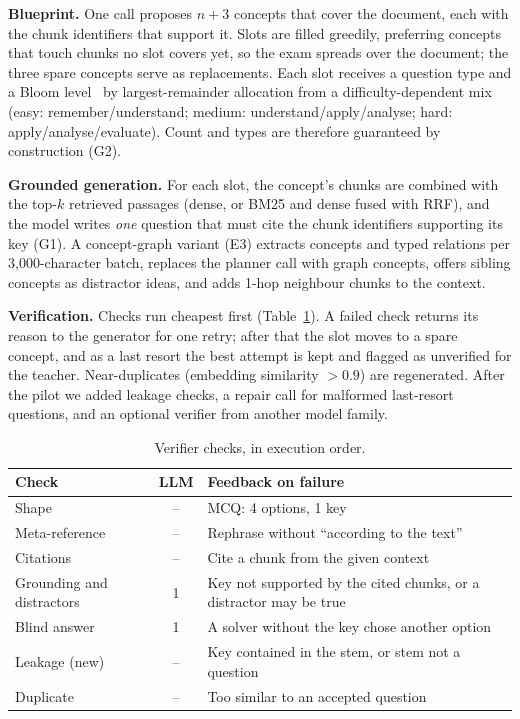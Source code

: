 \documentclass[conference]{IEEEtran}
\begin{document}
\textbf{Blueprint.} One call proposes $n+3$ concepts that cover the document, each with the chunk
identifiers that support it. Slots are filled greedily, preferring concepts that touch chunks no slot
covers yet, so the exam spreads over the document; the three spare concepts serve as replacements.
Each slot receives a question type and a Bloom level~\cite{anderson2001bloom} by largest-remainder
allocation from a difficulty-dependent mix (easy: remember/understand; medium:
understand/apply/analyse; hard: apply/analyse/evaluate). Count and types are therefore guaranteed by
construction (G2).

\textbf{Grounded generation.} For each slot, the concept's chunks are combined with the top-$k$
retrieved passages (dense, or BM25 and dense fused with RRF), and the model writes \emph{one}
question that must cite the chunk identifiers supporting its key (G1). A concept-graph variant (E3)
extracts concepts and typed relations per 3{,}000-character batch, replaces the planner call with graph
concepts, offers sibling concepts as distractor ideas, and adds 1-hop neighbour chunks to the context.

\textbf{Verification.} Checks run cheapest first (Table~\ref{tab:verifier}). A failed check returns its
reason to the generator for one retry; after that the slot moves to a spare concept, and as a last
resort the best attempt is kept and flagged as unverified for the teacher. Near-duplicates (embedding
similarity $>0.9$) are regenerated. After the pilot we added leakage checks, a repair call for malformed
last-resort questions, and an optional verifier from another model family.

\begin{table}[t]
\centering
\caption{Verifier checks, in execution order.}
\label{tab:verifier}
\footnotesize
\setlength{\tabcolsep}{3pt}
\begin{tabular}{@{}>{\raggedright\arraybackslash}p{2.0cm}c>{\raggedright\arraybackslash}p{4.6cm}@{}}
\toprule
Check & LLM & Feedback on failure \\
\midrule
Shape & -- & MCQ: 4 options, 1 key \\
Meta-reference & -- & Rephrase without ``according to the text'' \\
Citations & -- & Cite a chunk from the given context \\
Grounding and distractors & 1 & Key not supported by the cited chunks, or a distractor may be true \\
Blind answer & 1 & A solver without the key chose another option \\
Leakage (new) & -- & Key contained in the stem, or stem not a question \\
Duplicate & -- & Too similar to an accepted question \\
\bottomrule
\end{tabular}
\end{table}
\end{document}
